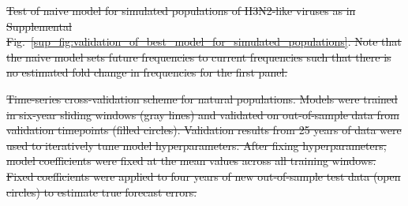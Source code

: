 \documentclass[9pt,lineno]{elife} %
\providecommand{\DIFdel}[1]{{\protect\color{red}\sout{#1}}}                      %
\providecommand{\DIFdelFL}[1]{\DIFdel{#1}} %
\providecommand{\DIFdeltex}[1]{{\protect\color{red}\sout{#1}}}                      %
\providecommand{\DIFdelFL}[1]{\DIFdel{#1}} %
\providecommand{\DIFdel}[1]{\texorpdfstring{\DIFdeltex{#1}}{}} %
\begin{document}
{%
\DIFdelFL{Test of naive model for simulated populations of H3N2-like viruses as in Supplemental Fig.~\ref{sup_fig:validation_of_best_model_for_simulated_populations}.
  Note that the naive model sets future frequencies to current frequencies such that there is no estimated fold change in frequencies for the first panel.
  }}

{%
\DIFdelFL{Time-series cross-validation scheme for natural populations.
  Models were trained in six-year sliding windows (gray lines) and validated on out-of-sample data from validation timepoints (filled circles).
  Validation results from 25 years of data were used to iteratively tune model hyperparameters.
  After fixing hyperparameters, model coefficients were fixed at the mean values across all training windows.
  Fixed coefficients were applied to four years of new out-of-sample test data (open circles) to estimate true forecast errors.
  }}
\end{document}
